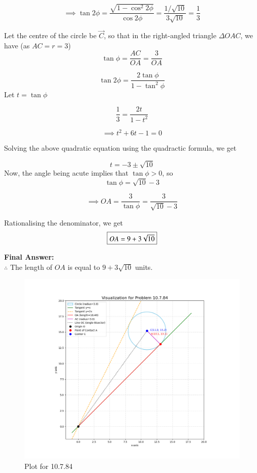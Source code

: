 \documentclass[journal,12pt,onecolumn]{IEEEtran}
\theoremstyle{remark}
\begin{document}
\begin{equation}
    \implies \tan{2\phi} = \frac{\sqrt{1 - \cos^2{2\phi}}}{\cos{2\phi}} = \frac{1/\sqrt{10}}{3\sqrt{10}} = \frac{1}{3}
\end{equation}

Let the centre of the circle be $\vec{C}$, so that in the right-angled triangle $\Delta OAC$, we have (as $AC = r = 3$)
\begin{equation}
    \tan{\phi} = \frac{AC}{OA} = \frac{3}{OA}
\end{equation}

\begin{equation}
    \tan{2\phi} = \frac{2\tan{\phi}}{1 - \tan^2{\phi}}
\end{equation}
Let $t = \tan{\phi}$

\begin{equation}
    \frac{1}{3} = \frac{2t}{1 - t^2}
\end{equation}

\begin{equation}
    \implies t^2 + 6t -1 = 0
\end{equation}

Solving the above quadratic equation using the quadractic formula, we get

\begin{equation}
    t = -3 \pm \sqrt{10}
\end{equation}
Now, the angle being acute implies that $\tan{\phi} > 0$, so
\begin{equation}
    \tan{\phi} = \sqrt{10} - 3
\end{equation}

\begin{equation}
    \implies OA = \frac{3}{\tan{\phi}} = \frac{3}{\sqrt{10} - 3}
\end{equation}

Rationalising the denominator, we get
\begin{equation}
    \fbox{$OA = 9 + 3\sqrt{10}$}
\end{equation}

\textbf{Final Answer: }\\
$\therefore$ The length of $OA$ is equal to $9 + 3\sqrt{10}$ units.
\begin{figure}[H]
    \centering
    \includegraphics[width=0.60\columnwidth]{figs/2.png}
    \caption{Plot for 10.7.84}
\end{figure}
\end{document}

